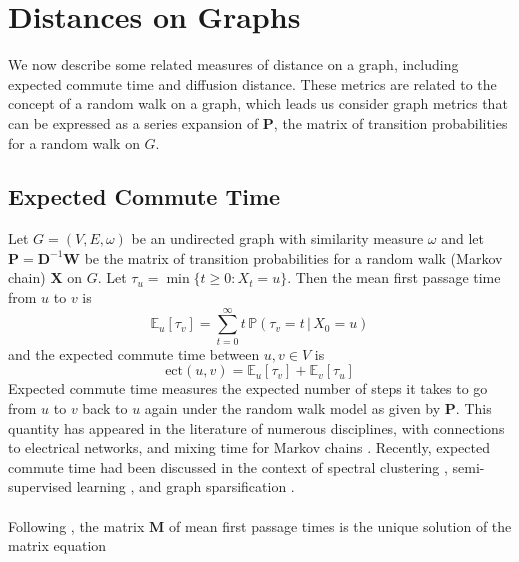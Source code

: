 \documentclass[10pt,twocolumn]{article}
\numberwithin{equation}{section}
\begin{document}
\section{Distances on Graphs}
\label{sec:distances-graphs}
We now describe
some related measures of distance on a graph, including
expected commute time and diffusion distance. 
These metrics are related to the concept of a random
walk on a graph, which leads us consider graph metrics
that can be expressed as a series expansion of $\mathbf{P}$,
the matrix of transition probabilities for a random walk on $G$.


\subsection{Expected Commute Time}
\label{sec:expect-comm-time}
Let $G = (V,E,\omega)$ be an undirected graph with similarity measure
$\omega$ and let 
$\mathbf{P} = \mathbf{D}^{-1}\mathbf{W}$
be the matrix of transition probabilities for a random walk 
(Markov chain) $\mathbf{X}$ on $G$.
Let $\tau_u = \min\{ t \geq 0 \colon X_t = u \}$.
Then the mean first passage time from $u$ to $v$ is
\begin{equation}
  \label{eq:6}
  \mathbb{E}_{u}[\tau_v] = \sum_{t = 0}^{\infty}{t \, \mathbb{P}(\tau_v =
    t \,|\, X_0 = u)}
\end{equation}
and the expected commute time between $u,v \in V$ is
\begin{equation}
  \label{eq:5}
  \mbox{ect}(u,v) = \mathbb{E}_{u}[\tau_v] + \mathbb{E}_{v}[\tau_u] 
\end{equation}
Expected commute time measures the expected number
of steps it takes to go from $u$ to $v$ back to $u$ again under the
random walk model as given by $\mathbf{P}$. This quantity has
 appeared in the literature of numerous disciplines, with
connections to electrical networks,
\cite{doyle84:_random_walks_elect_networ} and mixing time for Markov
chains
\cite{lovasz96:_random_graph,levin09:_markov_chain_mixin_times}.
Recently, expected commute time had been discussed in the context of
spectral clustering
\cite{saerens04,yen07:_graph,qui07:_clust}, semi-supervised learning
\cite{szummer01:_partial_markov,zhou04:_learn,zhou04:_learn_label_unlab,zhu03:_semi_super_learn_using_gauss},
and graph sparsification \cite{spielmand08:_graph}. \\ \\
\noindent
Following \cite{kemeny83:_finit_markov_chain}, the matrix
$\mathbf{M}$ of mean first passage times is 
the unique solution of the matrix equation
\end{document}
